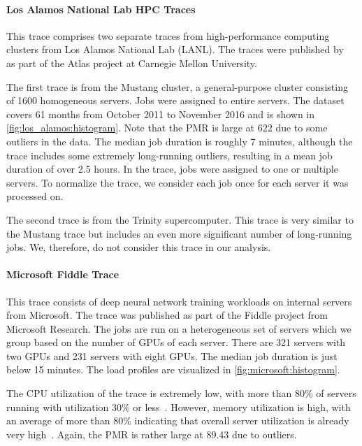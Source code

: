 \paragraph{Los Alamos National Lab HPC Traces~\cite{Amvrosiadis2018_3, Amvrosiadis2018, Amvrosiadis2018_2}} This trace comprises two separate traces from high-performance computing clusters from Los Alamos National Lab (LANL). The traces were published by \citeauthor*{Amvrosiadis2018}~\cite{Amvrosiadis2018} as part of the Atlas project at Carnegie Mellon University.

The first trace is from the Mustang cluster, a general-purpose cluster consisting of 1600 homogeneous servers. Jobs were assigned to entire servers. The dataset covers 61 months from October 2011 to November 2016 and is shown in \cref{fig:los_alamos:histogram}. Note that the PMR is large at $622$ due to some outliers in the data. The median job duration is roughly 7 minutes, although the trace includes some extremely long-running outliers, resulting in a mean job duration of over 2.5 hours. In the trace, jobs were assigned to one or multiple servers. To normalize the trace, we consider each job once for each server it was processed on.

The second trace is from the Trinity supercomputer. This trace is very similar to the Mustang trace but includes an even more significant number of long-running jobs. We, therefore, do not consider this trace in our analysis.

\paragraph{Microsoft Fiddle Trace~\cite{Jeon2019}} This trace consists of deep neural network training workloads on internal servers from Microsoft. The trace was published as part of the Fiddle project from Microsoft Research. The jobs are run on a heterogeneous set of servers which we group based on the number of GPUs of each server. There are 321 servers with two GPUs and 231 servers with eight GPUs. The median job duration is just below 15 minutes. The load profiles are visualized in \cref{fig:microsoft:histogram}.

The CPU utilization of the trace is extremely low, with more than 80\% of servers running with utilization 30\% or less~\cite{Santhanam2019}. However, memory utilization is high, with an average of more than 80\% indicating that overall server utilization is already very high~\cite{Santhanam2019}. Again, the PMR is rather large at 89.43 due to outliers.

